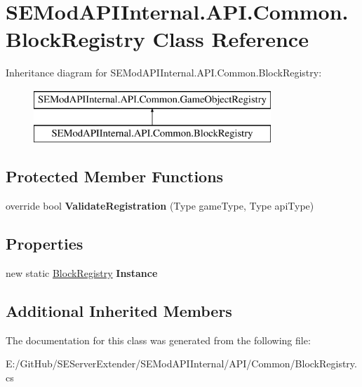 \hypertarget{class_s_e_mod_a_p_i_internal_1_1_a_p_i_1_1_common_1_1_block_registry}{}\section{S\+E\+Mod\+A\+P\+I\+Internal.\+A\+P\+I.\+Common.\+Block\+Registry Class Reference}
\label{class_s_e_mod_a_p_i_internal_1_1_a_p_i_1_1_common_1_1_block_registry}
Inheritance diagram for S\+E\+Mod\+A\+P\+I\+Internal.\+A\+P\+I.\+Common.\+Block\+Registry\+:\begin{figure}[H]
\begin{center}
\leavevmode
\includegraphics[height=2.000000cm]{class_s_e_mod_a_p_i_internal_1_1_a_p_i_1_1_common_1_1_block_registry}
\end{center}
\end{figure}
\subsection*{Protected Member Functions}
\begin{DoxyCompactItemize}
\item 
\hypertarget{class_s_e_mod_a_p_i_internal_1_1_a_p_i_1_1_common_1_1_block_registry_a935b298cbb3099a8b124098ff9146310}{}override bool {\bfseries Validate\+Registration} (Type game\+Type, Type api\+Type)\label{class_s_e_mod_a_p_i_internal_1_1_a_p_i_1_1_common_1_1_block_registry_a935b298cbb3099a8b124098ff9146310}

\end{DoxyCompactItemize}
\subsection*{Properties}
\begin{DoxyCompactItemize}
\item 
\hypertarget{class_s_e_mod_a_p_i_internal_1_1_a_p_i_1_1_common_1_1_block_registry_ae72153fdd3ce19695c2f8e08e1662ac7}{}new static \hyperlink{class_s_e_mod_a_p_i_internal_1_1_a_p_i_1_1_common_1_1_block_registry}{Block\+Registry} {\bfseries Instance}\label{class_s_e_mod_a_p_i_internal_1_1_a_p_i_1_1_common_1_1_block_registry_ae72153fdd3ce19695c2f8e08e1662ac7}

\end{DoxyCompactItemize}
\subsection*{Additional Inherited Members}


The documentation for this class was generated from the following file\+:\begin{DoxyCompactItemize}
\item 
E\+:/\+Git\+Hub/\+S\+E\+Server\+Extender/\+S\+E\+Mod\+A\+P\+I\+Internal/\+A\+P\+I/\+Common/Block\+Registry.\+cs\end{DoxyCompactItemize}
